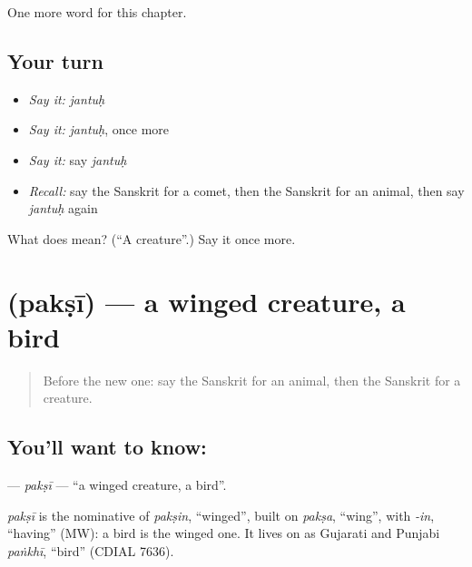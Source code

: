 \begin{grammarlens}[title={What you've built}]
One more word for this chapter.
\end{grammarlens}

\subsection*{Your turn}
\begin{itemize}
\raggedright
  \item \emph{Say it:} \emph{jantuḥ}
  \item \emph{Say it:} \emph{jantuḥ}, once more
  \item \emph{Say it:} say \emph{jantuḥ}
  \item \emph{Recall:} say the Sanskrit for a comet, then the Sanskrit for an animal, then say \emph{jantuḥ} again
\end{itemize}

\begin{tcolorbox}[breakable,colback=teal!4,colframe=teal!35!black,title={Before you move on}]
What does  mean? (\textquotedblleft{}A creature\textquotedblright{}.) Say it once more.
\end{tcolorbox}
\section[\texorpdfstring{\sk{पक्षी} (pakṣī)}{पक्षी (pakṣī)}]{ (pakṣī) — a winged creature, a bird}

\label{lesson:SA-C226-paksi}



\begin{quote}
Before the new one: say the Sanskrit for an animal, then the Sanskrit for a creature.
\end{quote}

\subsection*{You'll want to know: }
\textbf{} — \emph{pakṣī} — \textquotedblleft{}a winged creature, a bird\textquotedblright{}.

\begin{cousinweb}
\emph{pakṣī} is the nominative of \emph{pakṣin}, \textquotedblleft{}winged\textquotedblright{}, built on \emph{pakṣa}, \textquotedblleft{}wing\textquotedblright{}, with \emph{-in}, \textquotedblleft{}having\textquotedblright{} (MW): a bird is the winged one. It lives on as Gujarati and Punjabi \emph{paṅkhī}, \textquotedblleft{}bird\textquotedblright{} (CDIAL 7636).
\end{cousinweb}

